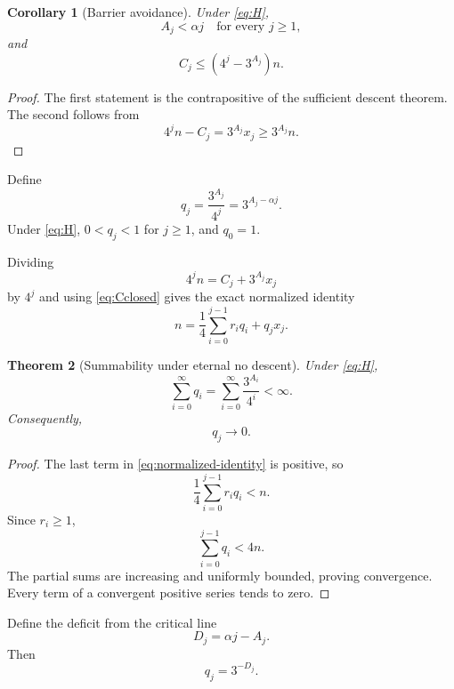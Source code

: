 \documentclass[11pt]{article}
\newtheorem{theorem}{Theorem}[section]
\newtheorem{corollary}[theorem]{Corollary}
\theoremstyle{definition}
\theoremstyle{remark}
\begin{document}
\begin{corollary}[Barrier avoidance]
Under \eqref{eq:H},
\begin{equation}
A_j<\alpha j
\quad\text{for every }j\ge1,
\label{eq:barrier-avoid}
\end{equation}
and
\begin{equation}
C_j\le(4^j-3^{A_j})n.
\label{eq:Cbound}
\end{equation}
\end{corollary}

\begin{proof}
The first statement is the contrapositive of the sufficient descent theorem.  The second follows from
\[
4^jn-C_j=3^{A_j}x_j\ge3^{A_j}n.
\]
\end{proof}

Define
\begin{equation}
q_j=\frac{3^{A_j}}{4^j}=3^{A_j-\alpha j}.
\label{eq:qj}
\end{equation}
Under \eqref{eq:H}, $0<q_j<1$ for $j\ge1$, and $q_0=1$.

Dividing
\[
4^jn=C_j+3^{A_j}x_j
\]
by $4^j$ and using \eqref{eq:Cclosed} gives the exact normalized identity
\begin{equation}
\boxed{
n=
\frac14\sum_{i=0}^{j-1}r_iq_i+q_jx_j.
}
\label{eq:normalized-identity}
\end{equation}

\begin{theorem}[Summability under eternal no descent]
Under \eqref{eq:H},
\begin{equation}
\boxed{
\sum_{i=0}^{\infty}q_i
=
\sum_{i=0}^{\infty}\frac{3^{A_i}}{4^i}
<\infty.
}
\label{eq:qsum}
\end{equation}
Consequently,
\begin{equation}
q_j\to0.
\label{eq:qzero}
\end{equation}
\end{theorem}

\begin{proof}
The last term in \eqref{eq:normalized-identity} is positive, so
\[
\frac14\sum_{i=0}^{j-1}r_iq_i<n.
\]
Since $r_i\ge1$,
\[
\sum_{i=0}^{j-1}q_i<4n.
\]
The partial sums are increasing and uniformly bounded, proving convergence.  Every term of a convergent positive series tends to zero.
\end{proof}

Define the deficit from the critical line
\begin{equation}
D_j=\alpha j-A_j.
\label{eq:Dj}
\end{equation}
Then
\[
q_j=3^{-D_j}.
\]
\end{document}
